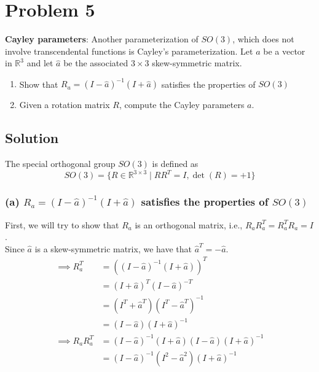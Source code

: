 \section*{Problem 5}

\textbf{Cayley parameters}:
Another parameterization of \(S O(3)\), which does not involve transcendental functions is Cayley's parameterization.
Let \(a\) be a vector in \(\mathbb{R}^{3}\) and let \(\hat{a}\) be the associated \(3 \times 3\) skew-symmetric matrix.
\begin{enumerate}[label= (\alph*)]
    \item Show that \(R_{a}=(I-\hat{a})^{-1}(I+\hat{a})\) satisfies the properties of \(S O(3)\)
    \item Given a rotation matrix \(R\), compute the Cayley parameters \(a\).
\end{enumerate}

\subsection*{Solution}

The special orthogonal group \( SO(3) \) is defined as
\[
    SO(3) = \{ R \in \mathbb{R}^{3 \times 3} \mid R R^{T} = I, \det(R) = +1 \}
\]

\subsubsection*{(a) \( R_{a}=(I-\hat{a})^{-1}(I+\hat{a}) \) satisfies the properties of \( SO(3) \)}

First, we will try to show that \( R_{a} \) is an orthogonal matrix, i.e., \( R_{a} R_{a}^{T} = R_{a}^{T} R_{a} = I \).\\
Since \( \hat a \) is a skew-symmetric matrix, we have that \( \hat a^{T} = -\hat a \).
\begin{align*}
    \implies
    R_a^T
     & =
    \left( (I - \hat{a})^{-1} (I + \hat{a}) \right)^T
    \\ & =
    (I + \hat{a})^T (I - \hat{a})^{-T}
    \\ & =
    (I^T + \hat{a}^T) (I^T - \hat{a}^T)^{-1}
    \\ & =
    (I - \hat{a}) (I + \hat{a})^{-1}
    \\
    \implies
    R_a R_a^T
     & =
    (I - \hat{a})^{-1} (I + \hat{a}) (I - \hat{a}) (I + \hat{a})^{-1}
    \\ & =
    (I - \hat{a})^{-1} (I^2 - \hat{a}^2) (I + \hat{a})^{-1}
\end{align*}
